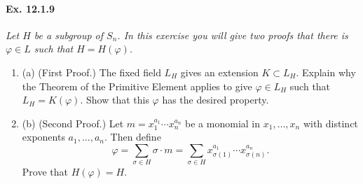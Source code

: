 \documentclass[11pt,a4paper]{article}
\newcommand{\be} {\begin{enumerate}}
\newcommand{\ee} {\end{enumerate}}
\begin{document}
\paragraph{Ex. 12.1.9}

{\it Let $H$ be a subgroup of $S_n$. In this exercise you will give two proofs that there is $\varphi \in L$ such that $H = H(\varphi)$.
\be
\item[(a)](First Proof.) The fixed field $L_H$ gives an extension $K \subset L_H$. Explain why the Theorem of the Primitive Element applies to give $\varphi \in L_H$ such that $L_H = K(\varphi)$. Show that this $\varphi$ has the desired property.

\item[(b)] (Second Proof.) Let $m = x_1^{a_1}\cdots x_n^{a_n}$ be a monomial in $x_1,\ldots,x_n$ with distinct exponents $a_1,\ldots,a_n$. Then define
$$\varphi = \sum_{\sigma \in H} \sigma \cdot m = \sum_{\sigma \in H} x_{\sigma(1)}^{a_1} \cdots x_{\sigma(n)}^{a_n}.$$
Prove that $H(\varphi) = H$.
\ee
}
\end{document}
